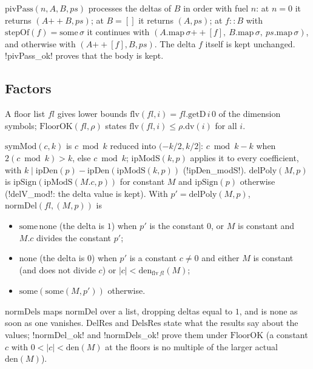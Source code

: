 \begin{definition}
$\mathrm{pivPass}(n,A,B,ps)$ processes the deltas of $B$ in order with fuel $n$: at $n=0$ it returns $(A\mathbin{+\!\!+}B,ps)$; at $B=[]$ it returns $(A,ps)$; at $f\mathbin{::}B$ with $\mathrm{stepOf}(f)=\mathrm{some}\,\sigma$ it continues with $(A.\mathrm{map}\,\sigma\mathbin{+\!\!+}[f],\ B.\mathrm{map}\,\sigma,\ ps.\mathrm{map}\,\sigma)$, and otherwise with $(A\mathbin{+\!\!+}[f],B,ps)$. The delta $f$ itself is kept unchanged. \lean!pivPass_ok! proves that the body is kept.
\end{definition}

\subsection{Factors}

\begin{definition}[Floors]
A floor list $\mathit{fl}$ gives lower bounds $\mathrm{flv}(\mathit{fl},i)=\mathit{fl}.\mathrm{getD}\,i\,0$ of the dimension symbols; $\mathrm{FloorOK}(\mathit{fl},\rho)$ states $\mathrm{flv}(\mathit{fl},i)\le\rho.\mathrm{dv}(i)$ for all $i$.
\end{definition}

\begin{definition}
$\mathrm{symMod}(c,k)$ is $c\bmod k$ reduced into $(-k/2,k/2]$: $c\bmod k-k$ when $2(c\bmod k)>k$, else $c\bmod k$; $\mathrm{ipModS}(k,p)$ applies it to every coefficient, with $k\mid\mathrm{ipDen}(p)-\mathrm{ipDen}(\mathrm{ipModS}(k,p))$ (\lean!ipDen_modS!). $\mathrm{delPoly}(M,p)$ is $\mathrm{ipSign}(\mathrm{ipModS}(M.c,p))$ for constant $M$ and $\mathrm{ipSign}(p)$ otherwise (\lean!delV_mod!: the delta value is kept). With $p'=\mathrm{delPoly}(M,p)$, $\mathrm{normDel}(\mathit{fl},(M,p))$ is
\begin{itemize}
\item $\mathrm{some}\,\mathrm{none}$ (the delta is $1$) when $p'$ is the constant $0$, or $M$ is constant and $M.c$ divides the constant $p'$;
\item $\mathrm{none}$ (the delta is $0$) when $p'$ is a constant $c\neq0$ and either $M$ is constant (and does not divide $c$) or $|c|<\mathrm{den}_{\mathrm{flv}\,\mathit{fl}}(M)$;
\item $\mathrm{some}(\mathrm{some}(M,p'))$ otherwise.
\end{itemize}
$\mathrm{normDels}$ maps $\mathrm{normDel}$ over a list, dropping deltas equal to $1$, and is $\mathrm{none}$ as soon as one vanishes. $\mathrm{DelRes}$ and $\mathrm{DelsRes}$ state what the results say about the values; \lean!normDel_ok! and \lean!normDels_ok! prove them under $\mathrm{FloorOK}$ (a constant $c$ with $0<|c|<\mathrm{den}(M)$ at the floors is no multiple of the larger actual $\mathrm{den}(M)$).
\end{definition}

